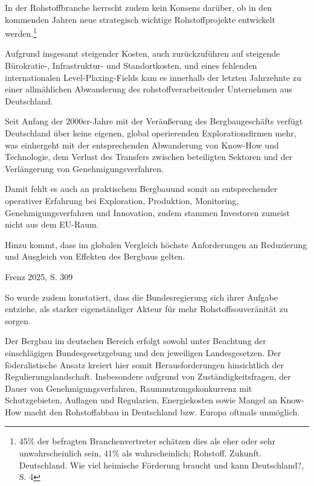 \documentclass[12pt,a4paper,oneside]{book} %
\begin{document}
In der Rohstoffbranche herrscht zudem kein Konsens darüber, ob in den kommenden Jahren neue strategisch wichtige Rohstoffprojekte entwickelt werden.\footnote{45\% der befragten Branchenvertreter schätzen dies als eher oder sehr unwahrscheinlich sein, 41\% als wahrscheinlich; Rohstoff. Zukunft. Deutschland. Wie viel heimische Förderung braucht und kann Deutschland?, S. 4}

Aufgrund insgesamt steigender Kosten, auch zurückzuführen auf steigende Bürokratie-, Infrastruktur- und Standortkosten, und eines fehlenden internationalen Level-Plaxing-Fields kam es innerhalb der letzten Jahrzehnte zu einer allmählichen Abwanderung des rohstoffverarbeitender Unternehmen aus Deutschland.\autocite{Frenz 2025, S. 310, 314}

Seit Anfang der 2000er-Jahre mit der Veräußerung des Bergbaugeschäfts verfügt Deutschland über keine eigenen, global operierenden Explorationsfirmen mehr, was einhergeht mit der entsprechenden Abwanderung von Know-How und Technologie, dem Verlust des Transfers zwischen beteiligten Sektoren und der Verlängerung von Genehmigungsverfahren.\autocite{Frenz 2025, 89} 

Damit fehlt es auch an \glqq praktischem Bergbau\grqq und somit an entsprechender operativer Erfahrung bei Exploration, Produktion, Monitoring, Genehmigungsverfahren und Innovation, zudem stammen Investoren zumeist nicht aus dem EU-Raum.\autocite{Frenz 2025, S. 90.}

Hinzu kommt, dass im globalen Vergleich höchste Anforderungen an Reduzierung und Ausgleich von Effekten des Bergbaus gelten.\autocite{Frenz 2025, S. 312}

Frenz 2025, S. 309




So wurde zudem konstatiert, dass die Bundesregierung sich ihrer Aufgabe entziehe, \glqq  als starker eigenständiger Akteur für mehr Rohstoffsouveränität zu sorgen\grqq.\autocite{Wirtschaft fordert mehr Tempo bei Rohstofffonds}



Der Bergbau im deutschen Bereich erfolgt sowohl unter Beachtung der einschlägigen Bundesgesetzgebung und den jeweiligen Landesgesetzen. Der föderalistische Ansatz kreiert hier somit Herausforderungen hinsichtlich der Regulierungslandschaft.
Insbesondere aufgrund von Zuständigkeitsfragen, der Dauer von Genehmigungsverfahren, Raumnutzungskonkurrenz mit Schutzgebieten, Auflagen und Regularien, Energiekosten sowie Mangel an Know-How macht den Rohstoffabbau in Deutschland bzw. Europa oftmals unmöglich.\autocites{Frenz 2025, S. 71-72}{Hilgers, Becker, World of Mining 72, 254-263.}
\end{document}

